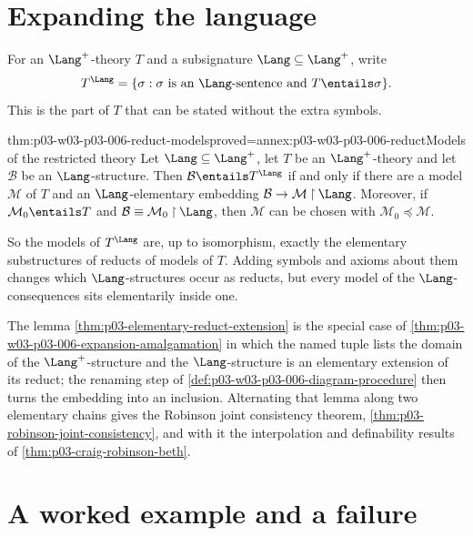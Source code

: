 \section{Expanding the language}
\label{sec:p03-w03-p03-006-expansion}

For an \(\Lang^+\)-theory \(T\) and a subsignature \(\Lang\subseteq\Lang^+\),
write
\[
 T^{\Lang}=\{\sigma:\sigma\text{ is an }\Lang\text{-sentence and }T\entails\sigma\}.
\]
This is the part of \(T\) that can be stated without the extra symbols.

\begin{hbtheorem}{thm:p03-w03-p03-006-reduct-models}{proved=annex:p03-w03-p03-006-reduct}{Models of the restricted theory}
Let \(\Lang\subseteq\Lang^+\), let \(T\) be an \(\Lang^+\)-theory and let
\(\mathcal B\) be an \(\Lang\)-structure.  Then
\(\mathcal B\entails T^{\Lang}\) if and only if there are a model
\(\mathcal M\) of \(T\) and an \(\Lang\)-elementary embedding
\(\mathcal B\to\mathcal M\mathbin{\upharpoonright}\Lang\).  Moreover, if
\(\mathcal M_0\entails T\) and
\(\mathcal B\equiv\mathcal M_0\mathbin{\upharpoonright}\Lang\), then
\(\mathcal M\) can be chosen with \(\mathcal M_0\preccurlyeq\mathcal M\).
\end{hbtheorem}

So the models of \(T^{\Lang}\) are, up to isomorphism, exactly the
elementary substructures of reducts of models of \(T\).  Adding symbols and
axioms about them changes which \(\Lang\)-structures occur as reducts, but
every model of the \(\Lang\)-consequences sits elementarily inside one.

The lemma \cref{thm:p03-elementary-reduct-extension} is the special case of
\cref{thm:p03-w03-p03-006-expansion-amalgamation} in which the named tuple
lists the domain of the \(\Lang^+\)-structure and the \(\Lang\)-structure
is an elementary extension of its reduct; the renaming step of
\cref{def:p03-w03-p03-006-diagram-procedure} then turns the embedding into an
inclusion.  Alternating that lemma along two elementary chains gives the
Robinson joint consistency theorem,
\cref{thm:p03-robinson-joint-consistency}, and with it the interpolation
and definability results of \cref{thm:p03-craig-robinson-beth}.

\section{A worked example and a failure}
\label{sec:p03-w03-p03-006-examples}

